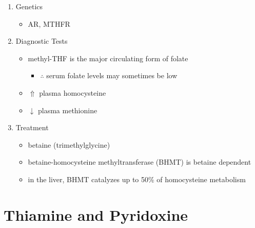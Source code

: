 \documentclass{scrartcl}
\begin{document}
\begin{enumerate}
\item Genetics
\label{sec:org9184ad5}
\begin{itemize}
\item AR, MTHFR
\end{itemize}

\item Diagnostic Tests
\label{sec:org64292da}
\begin{itemize}
\item methyl-THF is the major circulating form of folate
\begin{itemize}
\item \(\therefore\) serum folate levels may sometimes be low
\end{itemize}
\item \(\Uparrow\) plasma homocysteine
\item \(\downarrow\) plasma methionine
\end{itemize}

\item Treatment
\label{sec:org68dded2}
\begin{itemize}
\item betaine (trimethylglycine)
\item betaine-homocysteine methyltransferase (BHMT) is betaine dependent
\end{itemize}
\begin{itemize}
\item in the liver, BHMT catalyzes up to 50\% of homocysteine metabolism
\end{itemize}
\end{enumerate}

\section{Thiamine and Pyridoxine}
\label{sec:org1d31125}
\end{document}
